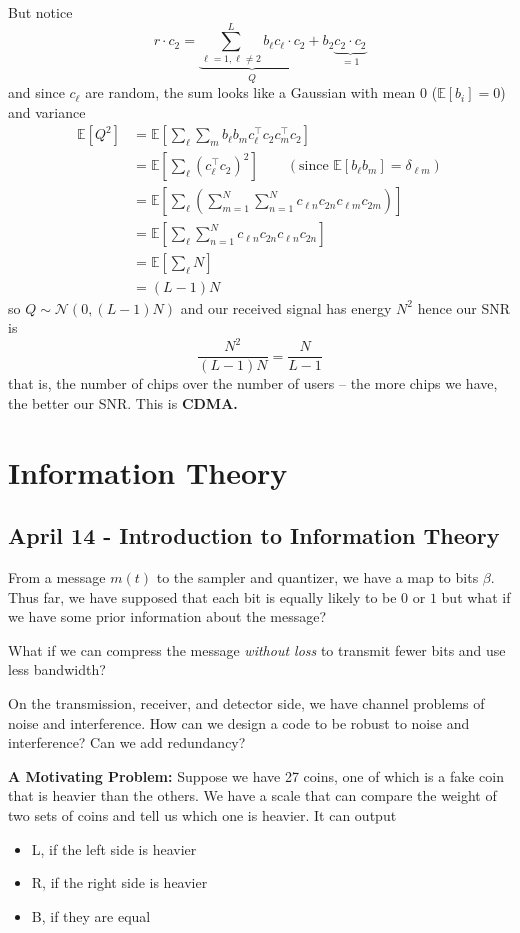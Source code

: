 \documentclass[12pt]{report}
\newcommand{\E}{\mathbb{E}}
\newcommand{\Nc}{\mathcal{N}}
\newcommand*{\tbf}[1]{\ifmmode\mathbf{#1}\else\textbf{#1}\fi}
\begin{document}
But notice 
\[r \cdot c_2 = \underbrace{\sum_{\ell = 1, \ell \neq 2}^L b_{\ell} c_{\ell} \cdot c_2}_Q + b_2 \underbrace{c_2 \cdot c_2}_{=1}\]
and since $c_{\ell}$ are random, the sum looks like a Gaussian with mean $0$ ($\E[b_i] = 0$) and variance 
\begin{align*}
    \E[Q^2] &= \E\left[\sum_{\ell} \sum_m b_{\ell} b_{m} c_{\ell}^{\top} c_2 c_m^{\top} c_2\right] \\ 
    &= \E\left[\sum_{\ell} (c_{\ell}^{\top} c_2)^2\right] \qquad (\text{since } \E[b_{\ell} b_m] = \delta_{\ell m})\\
    &= \E\left[\sum_{\ell} \left(\sum_{m=1}^N \sum_{n=1}^N c_{\ell n} c_{2n} c_{\ell m} c_{2 m}\right) \right] \\ 
    &= \E\left[\sum_{\ell} \sum_{n=1}^N c_{\ell n} c_{2 n} c_{\ell n} c_{2n}\right]\\ 
    &= \E\left[\sum_{\ell} N\right] \\ 
    &= (L-1)N
\end{align*}
so $Q \sim \Nc(0, (L-1)N)$ and our received signal has energy $N^2$ hence our SNR is 
\[\frac{N^2}{(L-1)N} = \frac{N}{L-1}\] 
that is, the number of chips over the number of users -- the more chips we have, the better our SNR. This is \tbf{CDMA.}

\chapter{Information Theory}
\section{April 14 - Introduction to Information Theory}

From a message $m(t)$ to the sampler and quantizer, we have a map to bits $\beta$. Thus far, we have supposed that each bit is equally likely to be $0$ or $1$ but what if we have some prior information about the message? 

What if we can compress the message \emph{without loss} to transmit fewer bits and use less bandwidth? 

On the transmission, receiver, and detector side, we have channel problems of noise and interference. How can we design a code to be robust to noise and interference? Can we add redundancy?  

\tbf{A Motivating Problem:} Suppose we have 27 coins, one of which is a fake coin that is heavier than the others. We have a scale that can compare the weight of two sets of coins and tell us which one is heavier. It can output 
\begin{itemize}
    \item L, if the left side is heavier
    \item R, if the right side is heavier
    \item B, if they are equal
\end{itemize}
\end{document}
